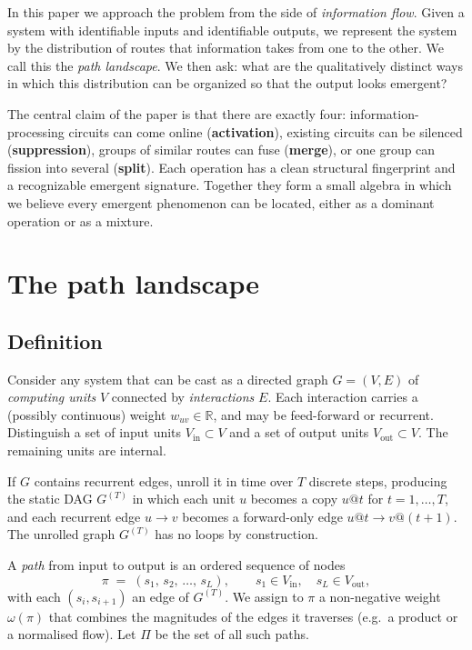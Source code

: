 \documentclass[11pt,a4paper]{article}
\begin{document}
In this paper we approach the problem from the side of \emph{information
flow}. Given a system with identifiable inputs and identifiable
outputs, we represent the system by the distribution of routes that
information takes from one to the other. We call this the
\emph{path landscape}. We then ask: what are the qualitatively
distinct ways in which this distribution can be organized so that
the output looks emergent?

The central claim of the paper is that there are exactly four:
information-processing circuits can come online (\textbf{activation}),
existing circuits can be silenced (\textbf{suppression}), groups of
similar routes can fuse (\textbf{merge}), or one group can fission
into several (\textbf{split}). Each operation has a clean structural
fingerprint and a recognizable emergent signature. Together they
form a small algebra in which we believe every emergent phenomenon
can be located, either as a dominant operation or as a mixture.

\section{The path landscape}

\subsection{Definition}

Consider any system that can be cast as a directed graph $G=(V,E)$
of \emph{computing units} $V$ connected by \emph{interactions}
$E$. Each interaction carries a (possibly continuous) weight
$w_{uv}\in\mathbb{R}$, and may be feed-forward or recurrent.
Distinguish a set of input units $V_{\text{in}}\subset V$ and a set
of output units $V_{\text{out}}\subset V$. The remaining units are
internal.

If $G$ contains recurrent edges, unroll it in time over $T$
discrete steps, producing the static DAG
$G^{(T)}$ in which each unit $u$ becomes a copy $u\!@\!t$ for
$t=1,\dots,T$, and each recurrent edge $u\!\to\!v$ becomes a
forward-only edge $u\!@\!t \to v\!@\!(t{+}1)$. The unrolled graph
$G^{(T)}$ has no loops by construction.

A \emph{path} from input to output is an ordered sequence of nodes
\[
\pi \;=\; (s_1,\, s_2,\, \dots,\, s_L), \qquad
s_1\in V_{\text{in}},\quad s_L\in V_{\text{out}},
\]
with each $(s_i,s_{i+1})$ an edge of $G^{(T)}$.
We assign to $\pi$ a non-negative weight $\omega(\pi)$ that combines
the magnitudes of the edges it traverses (e.g.\ a product or a normalised
flow). Let $\Pi$ be the set of all such paths.
\end{document}
